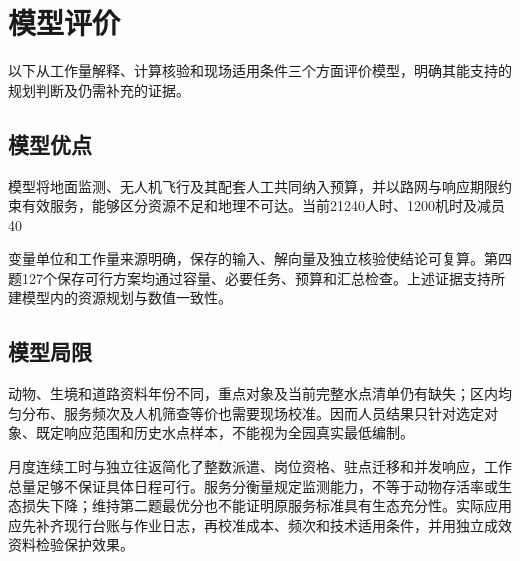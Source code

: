 \documentclass[UTF8,fontset=fandol,12pt,a4paper]{ctexart}
\begin{document}
\section{模型评价}

以下从工作量解释、计算核验和现场适用条件三个方面评价模型，明确其能支持的规划判断及仍需补充的证据。

\subsection{模型优点}

模型将地面监测、无人机飞行及其配套人工共同纳入预算，并以路网与响应期限约束有效服务，能够区分资源不足和地理不可达。当前21240人时、1200机时及减员40%

变量单位和工作量来源明确，保存的输入、解向量及独立核验使结论可复算。第四题127个保存可行方案均通过容量、必要任务、预算和汇总检查。上述证据支持所建模型内的资源规划与数值一致性。

\subsection{模型局限}

动物、生境和道路资料年份不同，重点对象及当前完整水点清单仍有缺失；区内均匀分布、服务频次及人机筛查等价也需要现场校准。因而人员结果只针对选定对象、既定响应范围和历史水点样本，不能视为全园真实最低编制。

月度连续工时与独立往返简化了整数派遣、岗位资格、驻点迁移和并发响应，工作总量足够不保证具体日程可行。服务分衡量规定监测能力，不等于动物存活率或生态损失下降；维持第二题最优分也不能证明原服务标准具有生态充分性。实际应用应先补齐现行台账与作业日志，再校准成本、频次和技术适用条件，并用独立成效资料检验保护效果。
\end{document}
